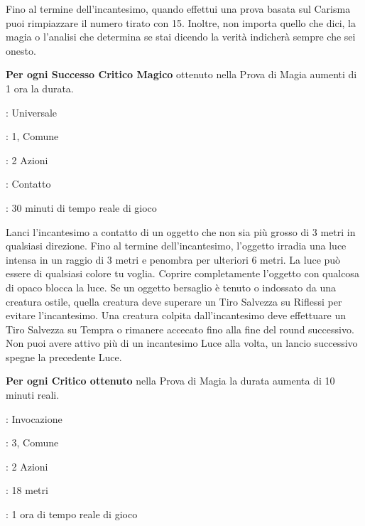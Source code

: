 \begin{multicols}{2}
Fino al termine dell'incantesimo, quando effettui una prova basata sul Carisma puoi rimpiazzare il numero tirato con 15. Inoltre, non importa quello che dici, la magia o l'analisi che determina se stai dicendo la verità indicherà sempre che sei onesto.

\textbf{Per ogni Successo Critico Magico} ottenuto nella Prova di Magia aumenti di 1 ora la durata.

\noindent\colorbox{OBSSgold!10}{
\begin{minipage}{0.95\linewidth}
\begin{description}[noitemsep, topsep=0pt, parsep=0pt, partopsep=0pt, leftmargin=0cm, labelwidth=1.3cm]
	\item[\textbf{Lista}]: Universale
	\item[\textbf{Livello}]: 1, Comune
	\item[\textbf{Lancio}]: 2 Azioni
	\item[\textbf{Gittata}]: Contatto
	\item[\textbf{Durata}]: 30 minuti di tempo reale di gioco
\end{description}
\end{minipage}}\smallskip

Lanci l'incantesimo a contatto di un oggetto che non sia più grosso di 3 metri in qualsiasi direzione. Fino al termine dell'incantesimo, l'oggetto irradia una luce intensa in un raggio di 3 metri e penombra per ulteriori 6 metri. La luce può essere di qualsiasi colore tu voglia. Coprire completamente l'oggetto con qualcosa di opaco blocca la luce. Se un oggetto bersaglio è tenuto o indossato da una creatura ostile, quella creatura deve superare un Tiro Salvezza su Riflessi per evitare l'incantesimo. Una creatura colpita dall'incantesimo deve effettuare un Tiro Salvezza su Tempra o rimanere accecato fino alla fine del round successivo. Non puoi avere attivo più di un incantesimo Luce alla volta, un lancio successivo spegne la precedente Luce.

\textbf{Per ogni Critico ottenuto} nella Prova di Magia la durata aumenta di 10 minuti reali.

\noindent\colorbox{OBSSgold!10}{
\begin{minipage}{0.95\linewidth}
\begin{description}[noitemsep, topsep=0pt, parsep=0pt, partopsep=0pt, leftmargin=0cm, labelwidth=1.3cm]
	\item[\textbf{Lista}]: Invocazione
	\item[\textbf{Livello}]: 3, Comune
	\item[\textbf{Lancio}]: 2 Azioni
	\item[\textbf{Gittata}]: 18 metri
	\item[\textbf{Durata}]: 1 ora di tempo reale di gioco
\end{description}
\end{minipage}}\smallskip


\end{multicols}
